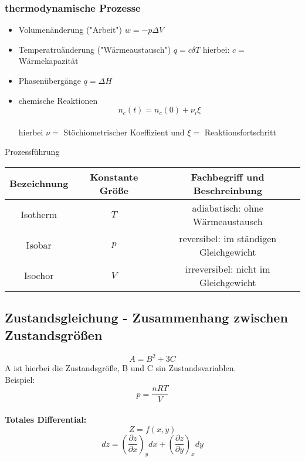 \documentclass[a4paper, fleqn]{article}
\begin{document}
\subsubsection{thermodynamische Prozesse}
\begin{itemize}
    \item Volumenänderung ("Arbeit") $w = -p \Delta V$
    \item Temperatruänderung ("Wärmeaustausch") $q = c \delta T$ hierbei: $c =$ Wärmekapazität
    \item Phasenübergänge $q = \Delta H$
    \item chemische Reaktionen \\ \begin{equation*}
        n_c(t)=n_c(0)+\nu_i\xi
    \end{equation*}\\hierbei $\nu =$ Stöchiometrischer Koeffizient und $\xi =$ Reaktionsfortschritt
\end{itemize}
\begin{center}
    Prozessführung
    \begin{tabular}{c c c} 
        \hline
        Bezeichnung & Konstante Größe & Fachbegriff und Beschreinbung \\ 
        \hline
        Isotherm & $T$ & adiabatisch: ohne Wärmeaustausch \\ 
        Isobar & $p$ & reversibel: im ständigen Gleichgewicht\\ 
        Isochor & $V$ & irreversibel: nicht im Gleichgewicht\\
        \hline
       \end{tabular}
\end{center}
\subsection{Zustandsgleichung - Zusammenhang zwischen Zustandsgrößen}
\begin{equation*}
    A = B^2 + 3C
\end{equation*}
A ist hierbei die Zustandsgröße, B und C sin Zustandsvariablen.\\
Beispiel:
\begin{equation*}
    p = \frac{nRT}{V}
\end{equation*}
\\
\textbf{Totales Differential:}\\
\begin{equation*}
    Z = f(x,y)
\end{equation*}
\begin{equation*}
    dz=\left(\frac{\partial z}{\partial x}\right)_ydx+\left(\frac{\partial z}{\partial y}\right)_xdy
\end{equation*}
\end{document}

